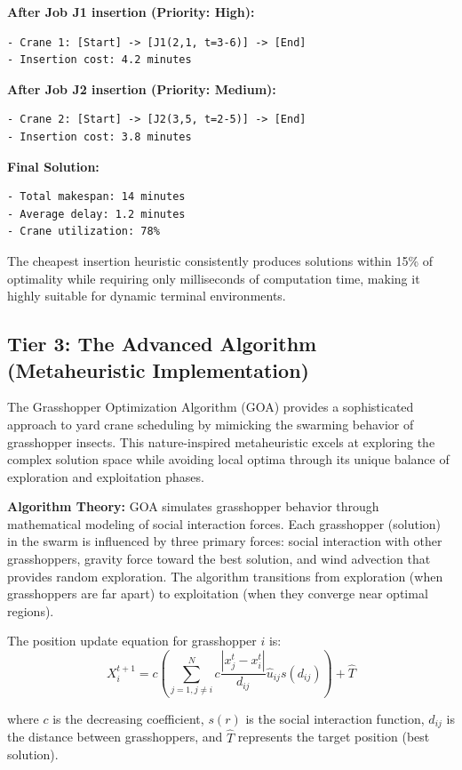 \documentclass{article}
\begin{document}
\textbf{After Job J1 insertion (Priority: High):}
\begin{verbatim}
- Crane 1: [Start] -> [J1(2,1, t=3-6)] -> [End]
- Insertion cost: 4.2 minutes
\end{verbatim}

\textbf{After Job J2 insertion (Priority: Medium):}
\begin{verbatim}
- Crane 2: [Start] -> [J2(3,5, t=2-5)] -> [End]
- Insertion cost: 3.8 minutes
\end{verbatim}

\textbf{Final Solution:}
\begin{verbatim}
- Total makespan: 14 minutes
- Average delay: 1.2 minutes
- Crane utilization: 78%
\end{verbatim}

The cheapest insertion heuristic consistently produces solutions within 15\% of optimality while requiring only milliseconds of computation time, making it highly suitable for dynamic terminal environments.

\subsection{Tier 3: The Advanced Algorithm (Metaheuristic Implementation)}

The Grasshopper Optimization Algorithm (GOA) provides a sophisticated approach to yard crane scheduling by mimicking the swarming behavior of grasshopper insects. This nature-inspired metaheuristic excels at exploring the complex solution space while avoiding local optima through its unique balance of exploration and exploitation phases.

\textbf{Algorithm Theory:} GOA simulates grasshopper behavior through mathematical modeling of social interaction forces. Each grasshopper (solution) in the swarm is influenced by three primary forces: social interaction with other grasshoppers, gravity force toward the best solution, and wind advection that provides random exploration. The algorithm transitions from exploration (when grasshoppers are far apart) to exploitation (when they converge near optimal regions).

The position update equation for grasshopper $i$ is:
\begin{equation}
X_i^{t+1} = c \left( \sum_{j=1, j \neq i}^{N} c \frac{|x_j^t - x_i^t|}{d_{ij}} \hat{u}_{ij} s(d_{ij}) \right) + \hat{T}
\end{equation}

where $c$ is the decreasing coefficient, $s(r)$ is the social interaction function, $d_{ij}$ is the distance between grasshoppers, and $\hat{T}$ represents the target position (best solution).
\end{document}
